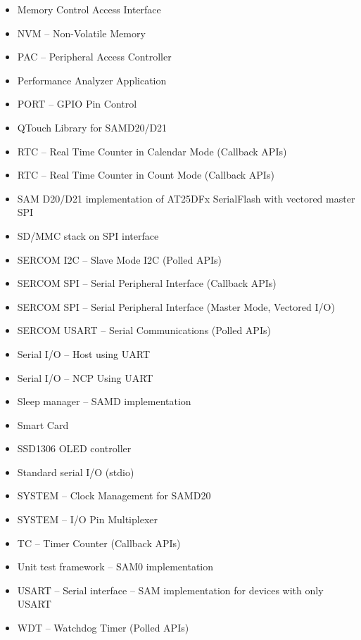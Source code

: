 \begin{multicols}{2}
\begin{flushleft}
\begin{itemize}
			\item Memory Control Access Interface
			\item NVM -- Non-Volatile Memory
			\item PAC -- Peripheral Access Controller
			\item Performance Analyzer Application
			\item PORT -- GPIO Pin Control
			\item QTouch Library for SAMD20/D21
			\item RTC -- Real Time Counter in Calendar Mode (Callback APIs)
			\item RTC -- Real Time Counter in Count Mode (Callback APIs)
			\item SAM D20/D21 implementation of AT25DFx SerialFlash with vectored master SPI
			\item SD/MMC stack on SPI interface
			\item SERCOM I2C -- Slave Mode I2C (Polled APIs)
			\item SERCOM SPI -- Serial Peripheral Interface (Callback APIs)
			\item SERCOM SPI -- Serial Peripheral Interface (Master Mode, Vectored I/O)
			\item SERCOM USART -- Serial Communications (Polled APIs)
			\item Serial I/O -- Host using UART
			\item Serial I/O -- NCP Using UART
			\item Sleep manager -- SAMD implementation
			\item Smart Card
			\item SSD1306 OLED controller
			\item Standard serial I/O (stdio)
			\item SYSTEM -- Clock Management for SAMD20
			\item SYSTEM -- I/O Pin Multiplexer
			\item TC -- Timer Counter (Callback APIs)
			\item Unit test framework -- SAM0 implementation
			\item USART -- Serial interface -- SAM implementation for devices with only USART
			\item WDT -- Watchdog Timer (Polled APIs)
		\end{itemize}
	\end{flushleft}
\end{multicols}

